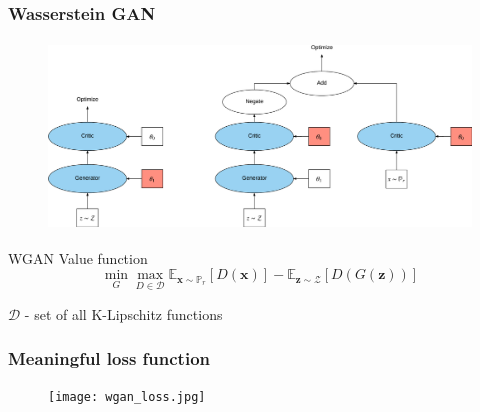 \documentclass{Bredelebeamer}
\begin{document}
\begin{frame}
	\frametitle{Wasserstein GAN}
	\begin{figure}[h!]
	\centering
	\includegraphics[height=5cm]{GAN_optimization_two_step.png}
	\end{figure}
	\begin{exampleblock}{WGAN Value function}
	\[
		\min_G \max_{D \in \mathcal{D}} \mathbb{E}_{\bm{x} \sim \mathbb{P}_r} \left[ D(\bm{x}) \right] - \mathbb{E}_{\bm{z} \sim \mathcal{Z}} \left[ D(G(\bm{z}))  \right]
	\]
	\begin{center}
		$\mathcal{D}$ - set of all K-Lipschitz functions
	\end{center}
	\end{exampleblock}
\end{frame}

\begin{frame}
	\frametitle{Meaningful loss function}
	\begin{figure}[h!]
		\centering
		\texttt{[image: wgan\_loss.jpg]}
	\end{figure}
\end{frame}
\end{document}
